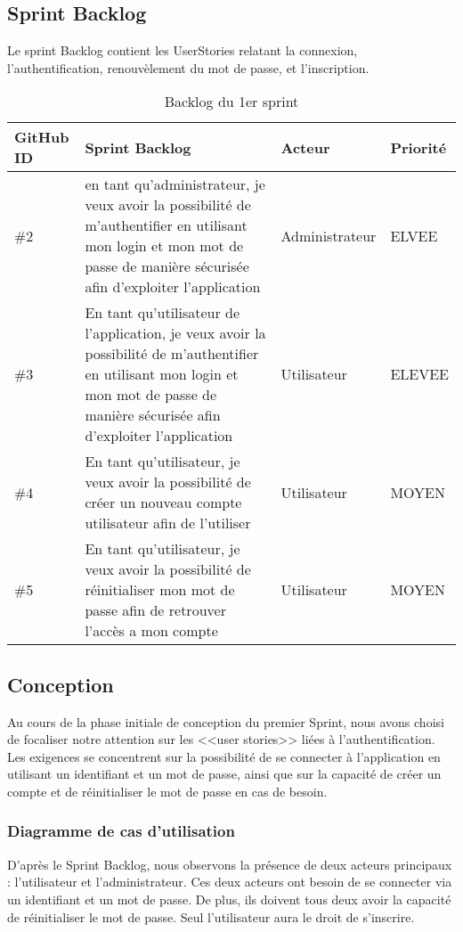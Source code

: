 \subsection{Sprint Backlog}
Le sprint Backlog contient les UserStories relatant la connexion, l'authentification, renouvèlement du mot de passe, et l'inscription.
$  $
\begin{center}
  \begin{table}[h!]
    \begin{tabular}{ | m{2cm} | m{7cm}| m{3cm} | m{2cm} |} 
     \hline
     GitHub ID & Sprint Backlog & Acteur & Priorité \\ [0.5ex] 
     \hline\hline
     \#2 & en tant qu'administrateur, je veux avoir la possibilité de m'authentifier en utilisant mon login et mon mot de passe de manière sécurisée afin d'exploiter l'application & Administrateur & ELVEE \\ 
     \hline
     \#3  & En tant qu'utilisateur de l'application, je veux avoir la possibilité de m'authentifier en utilisant mon login et mon mot de passe de manière sécurisée afin d'exploiter l'application & Utilisateur & ELEVEE \\
     \hline
     \#4 & En tant qu'utilisateur, je veux avoir la possibilité de créer un nouveau compte utilisateur afin de l'utiliser & Utilisateur & MOYEN \\
     \hline
     \#5 & En tant qu'utilisateur, je veux avoir la possibilité de réinitialiser mon mot de passe afin de retrouver l'accès a mon compte & Utilisateur & MOYEN \\ [1ex] 
     \hline
    \end{tabular}
    \caption{Backlog du 1er sprint}
  \end{table}
\end{center}
\newpage
\subsection{Conception}
Au cours de la phase initiale de conception du premier Sprint, nous avons choisi de focaliser notre attention sur les <<user stories>> liées à l'authentification. Les exigences se concentrent sur la possibilité de se connecter à l'application en utilisant un identifiant et un mot de passe, ainsi que sur la capacité de créer un compte et de réinitialiser le mot de passe en cas de besoin.
\subsubsection{Diagramme de cas d'utilisation}
D'après le Sprint Backlog, nous observons la présence de deux acteurs principaux : l'utilisateur et l'administrateur. Ces deux acteurs ont besoin de se connecter via un identifiant et un mot de passe. De plus, ils doivent tous deux avoir la capacité de réinitialiser le mot de passe. Seul l'utilisateur aura le droit de s'inscrire.

\newpage
